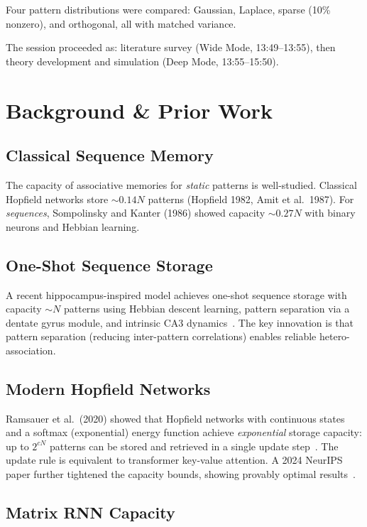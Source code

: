 \documentclass[11pt]{article}
\theoremstyle{definition}
\theoremstyle{remark}
\begin{document}
Four pattern distributions were compared: Gaussian, Laplace, sparse (10\% nonzero), and orthogonal, all with matched variance.

The session proceeded as: literature survey (Wide Mode, 13:49--13:55), then theory development and simulation (Deep Mode, 13:55--15:50).

\section{Background \& Prior Work}

\subsection{Classical Sequence Memory}

The capacity of associative memories for \emph{static} patterns is well-studied. Classical Hopfield networks store $\sim 0.14N$ patterns (Hopfield 1982, Amit et al.\ 1987). For \emph{sequences}, Sompolinsky and Kanter (1986) showed capacity $\sim 0.27N$ with binary neurons and Hebbian learning.

\subsection{One-Shot Sequence Storage}

A recent hippocampus-inspired model achieves one-shot sequence storage with capacity $\sim N$ patterns using Hebbian descent learning, pattern separation via a dentate gyrus module, and intrinsic CA3 dynamics~\cite{plos2024oneshot}. The key innovation is that pattern separation (reducing inter-pattern correlations) enables reliable hetero-association.

\subsection{Modern Hopfield Networks}

Ramsauer et al.\ (2020) showed that Hopfield networks with continuous states and a softmax (exponential) energy function achieve \emph{exponential} storage capacity: up to $2^{cN}$ patterns can be stored and retrieved in a single update step~\cite{ramsauer2020hopfield}. The update rule is equivalent to transformer key-value attention. A 2024 NeurIPS paper further tightened the capacity bounds, showing provably optimal results~\cite{neurips2024hopfield}.

\subsection{Matrix RNN Capacity}
\end{document}
